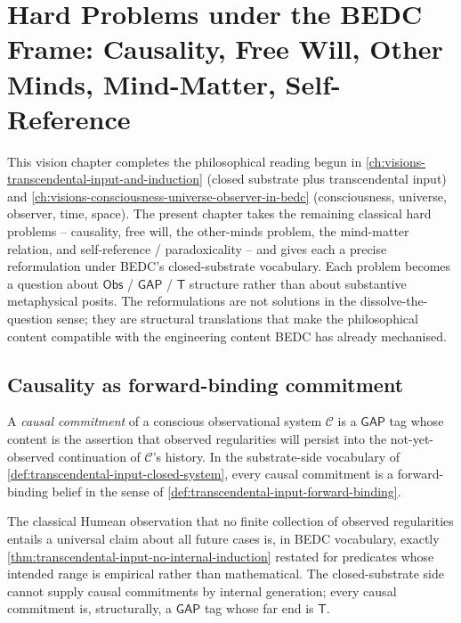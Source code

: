 \chapter{Hard Problems under the BEDC Frame: Causality, Free Will, Other Minds, Mind-Matter, Self-Reference}
\label{ch:visions-hard-problems-under-bedc}

This vision chapter completes the philosophical reading begun in \autoref{ch:visions-transcendental-input-and-induction} (closed substrate plus transcendental input) and \autoref{ch:visions-consciousness-universe-observer-in-bedc} (consciousness, universe, observer, time, space). The present chapter takes the remaining classical hard problems -- causality, free will, the other-minds problem, the mind-matter relation, and self-reference / paradoxicality -- and gives each a precise reformulation under BEDC's closed-substrate vocabulary. Each problem becomes a question about $\mathsf{Obs}$ / $\mathsf{GAP}$ / $\mathsf{T}$ structure rather than about substantive metaphysical posits. The reformulations are not solutions in the dissolve-the-question sense; they are structural translations that make the philosophical content compatible with the engineering content BEDC has already mechanised.

\section{Causality as forward-binding commitment}
\label{sec:hard-problems-causality}

\begin{definition}
\label{def:hard-problems-causal-commitment}
A \emph{causal commitment} of a conscious observational system $\mathcal{C}$ is a $\mathsf{GAP}$ tag whose content is the assertion that observed regularities will persist into the not-yet-observed continuation of $\mathcal{C}$'s history. In the substrate-side vocabulary of \autoref{def:transcendental-input-closed-system}, every causal commitment is a forward-binding belief in the sense of \autoref{def:transcendental-input-forward-binding}.
\end{definition}

\begin{principle}
\label{prin:hard-problems-hume-reformulated}
The classical Humean observation that no finite collection of observed regularities entails a universal claim about all future cases is, in BEDC vocabulary, exactly \autoref{thm:transcendental-input-no-internal-induction} restated for predicates whose intended range is empirical rather than mathematical. The closed-substrate side cannot supply causal commitments by internal generation; every causal commitment is, structurally, a $\mathsf{GAP}$ tag whose far end is $\mathsf{T}$.
\end{principle}

